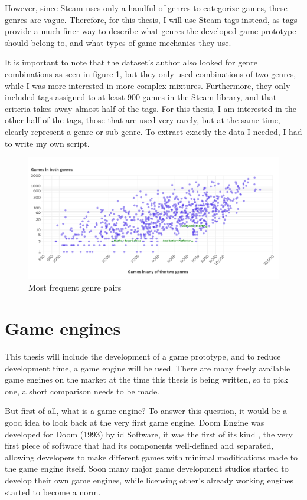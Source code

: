 However, since Steam uses only a handful of genres to categorize games, these genres are vague. Therefore, for this thesis, I will use Steam tags instead, as tags provide a much finer way to describe what genres the developed game prototype should belong to, and what types of game mechanics they use.

It is important to note that the dataset's author also looked for genre combinations as seen in figure \ref{figure:genre-pairs}, but they only used combinations of two genres, while I was more interested in more complex mixtures. Furthermore, they only included tags assigned to at least 900 games in the Steam library, and that criteria takes away almost half of the tags. For this thesis, I am interested in the other half of the tags, those that are used very rarely, but at the same time, clearly represent a genre or sub-genre. To extract exactly the data I needed, I had to write my own script.

\begin{figure}[h]
    \centering
    \includegraphics[width=\textwidth]{images/genre-pairs.png}
    \caption{Most frequent genre pairs}
    \label{figure:genre-pairs}
\end{figure}



\section{Game engines}

This thesis will include the development of a game prototype, and to reduce development time, a game engine will be used. There are many freely available game engines on the market at the time this thesis is being written, so to pick one, a short comparison needs to be made.

But first of all, what is a game engine? To answer this question, it would be a good idea to look back at the very first game engine. Doom Engine was developed for Doom (1993) by id Software, it was the first of its kind \cite{gregory2018gameEngineArchitecture}, the very first piece of software that had its components well-defined and separated, allowing developers to make different games with minimal modifications made to the game engine itself. Soon many major game development studios started to develop their own game engines, while licensing other's already working engines started to become a norm.

